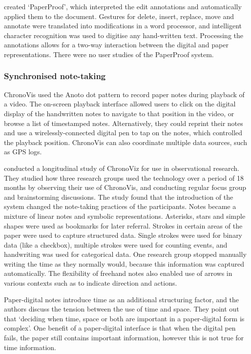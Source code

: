 \citet{Weibel2008} created `PaperProof', which interpreted the edit annotations and automatically applied them to the
document. Gestures for delete, insert, replace, move and annotate were translated into modifications in a word
processor, and intelligent character recognition was used to digitise any hand-written text. Processing the annotations
allows for a two-way interaction between the digital and paper representations. There were no user studies of the
PaperProof system.

\subsubsection{Synchronised note-taking}

ChronoVis \citep{Fouse2011} used the Anoto dot pattern to record paper notes during playback of a video. The on-screen
playback interface allowed users to click on the digital display of the handwritten notes to navigate to that position
in the video, or browse a list of timestamped notes. Alternatively, they could reprint their notes and use a
wirelessly-connected digital pen to tap on the notes, which controlled the playback position.
ChronoVis can also coordinate multiple data sources, such as GPS logs.

\citet{Weibel2012} conducted a longitudinal study of ChronoViz for use in observational research. They studied how
three research groups used the technology over a period of 18 months by observing their use of ChronoVis, and
conducting regular focus group and brainstorming discussions.  The study found that the introduction of the system
changed the note-taking practices of the participants.  Notes became a mixture of linear notes and symbolic
representations.  Asterisks, stars and simple shapes were used as bookmarks for later referral.  Strokes in certain
areas of the paper were used to capture structured data. Single strokes were used for binary data (like a checkbox),
multiple strokes were used for counting events, and handwriting was used for categorical data.  One research group
stopped manually writing the time as they normally would, because this information was captured automatically. The
flexibility of freehand notes also enabled use of arrows in various contexts such as to indicate direction and actions.

Paper-digital notes introduce time as an additional structuring factor, and the authors discuss the tension between the
use of time and space. They point out that `deciding when time, space or both are important in a paper-digital form is
complex'.  One benefit of a paper-digital interface is that when the digital pen fails, the paper still contains
important information, however this is not true for time information.

